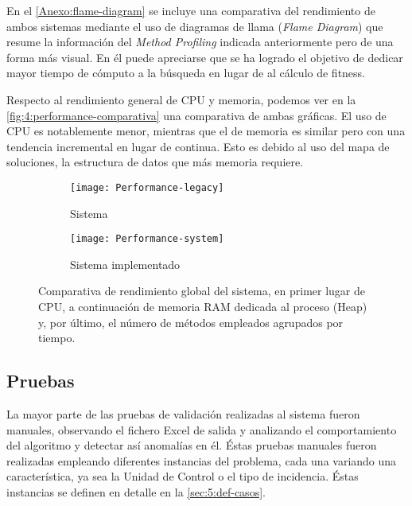 En el \autoref{Anexo:flame-diagram} se incluye una comparativa del rendimiento de ambos sistemas mediante el uso de diagramas de llama (\textit{Flame Diagram}) que resume la información del \textit{Method Profiling} indicada anteriormente pero de una forma más visual. En él puede apreciarse que se ha logrado el objetivo de dedicar mayor tiempo de cómputo a la búsqueda en lugar de al cálculo de fitness.


Respecto al rendimiento general de CPU y memoria, podemos ver en la \autoref{fig:4:performance-comparativa} una comparativa de ambas gráficas. El uso de CPU es notablemente menor, mientras que el de memoria es similar pero con una tendencia incremental en lugar de continua. Esto es debido al uso del mapa de soluciones, la estructura de datos que más memoria requiere.


\begin{figure}
	\centering
	\begin{subfigure}{\linewidth}
		\centering
		\texttt{[image: Performance-legacy]}
		\caption{Sistema \legacy{}}
		\label{fig:4:performance-legacy}
	\end{subfigure}
	
	\begin{subfigure}{\linewidth}
		\centering
		\texttt{[image: Performance-system]}
		\caption{Sistema implementado}
		\label{fig:4:performance-system}
	\end{subfigure}
	
	\caption[Comparativa de rendimiento global del sistema]{Comparativa de rendimiento global del sistema, en primer lugar de CPU, a continuación de memoria RAM dedicada al proceso (Heap) y, por último, el número de métodos empleados agrupados por tiempo.}
	\label{fig:4:performance-comparativa}
\end{figure}



\subsection{Pruebas}
\label{sec:4:tests}

La mayor parte de las pruebas de validación realizadas al sistema fueron manuales, observando el fichero Excel de salida y analizando el comportamiento del algoritmo y detectar así anomalías en él. Éstas pruebas manuales fueron realizadas empleando diferentes instancias del problema, cada una variando una característica, ya sea la Unidad de Control o el tipo de incidencia. Éstas instancias se definen en detalle en la \autoref{sec:5:def-casos}.

